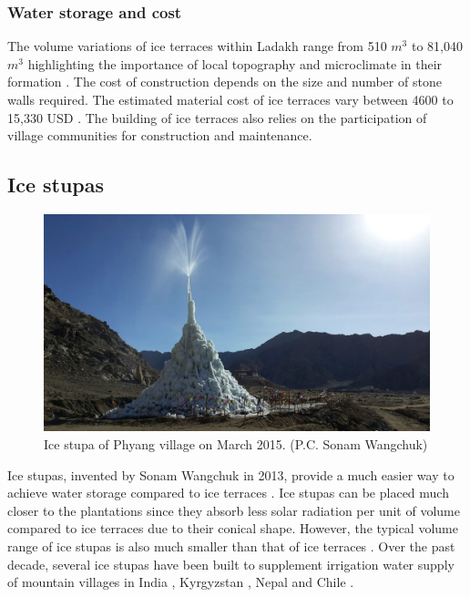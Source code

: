 \subsubsection{Water storage and cost}

The volume variations of ice terraces within Ladakh range from 510 $m^3$ to 81,040 $m^3$ highlighting
the importance of local topography and microclimate in their formation
\citep{nusserSociohydrologyArtificialGlaciers2019, norphelSnowWaterHarvesting2015}. The cost of construction
depends on the size and number of stone walls required. The estimated material cost of ice terraces vary between
4600 to 15,330 USD \citep{nusserSociohydrologyArtificialGlaciers2019}. The building of ice terraces also relies
on the participation of village communities for construction and maintenance.

\subsection{Ice stupas}

\begin{figure}[htb]
	\centering
	\includegraphics[width=\textwidth]{figs/IS_example.jpg}
	\caption{Ice stupa of Phyang village on March 2015. (P.C. Sonam Wangchuk)}
	\label{fig:ISexample}
\end{figure}

Ice stupas, invented by Sonam Wangchuk in 2013, provide a much easier way to achieve water storage compared to
ice terraces \citep{wangchukIceStupaArtificial2014}. Ice stupas can be placed much closer to the plantations
since they absorb less solar radiation per unit of volume compared to ice terraces due to their conical shape.
However, the typical volume range of ice stupas is also much smaller than that of ice
terraces \citep{nusserSociohydrologyArtificialGlaciers2019}. Over the past decade, several ice stupas have been
built to supplement irrigation water supply of mountain villages in India
\citep{wangchukIceStupaCompetition2020, palmerStoringFrozenWater2022, aggarwalAdaptationClimateChange2021},
Kyrgyzstan \citep{bbcnewsBrightArtificialGlacier2020}, Nepal and Chile
\citep{reutersConservationistsChileAim2021}.


